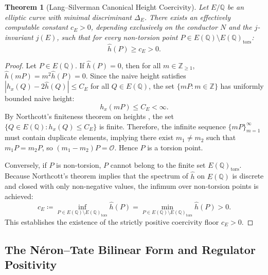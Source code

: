 \documentclass[11pt,reqno]{article}
\theoremstyle{plain}
\newtheorem{theorem}{Theorem}[section]
\theoremstyle{definition}
\begin{document}
\begin{theorem}[Lang--Silverman Canonical Height Coercivity]
\label{thm:lang_silverman}
Let $E/\mathbb{Q}$ be an elliptic curve with minimal discriminant $\Delta_E$. There exists an effectively computable constant $c_E > 0$, depending exclusively on the conductor $N$ and the $j$-invariant $j(E)$, such that for every non-torsion point $P \in E(\mathbb{Q}) \setminus E(\mathbb{Q})_{\mathrm{tors}}$:
\begin{equation}
    \label{eq:lang_silverman_bound}
    \hat{h}(P) \ge c_E > 0.
\end{equation}
\end{theorem}
\begin{proof}
Let $P \in E(\mathbb{Q})$. If $\hat{h}(P) = 0$, then for all $m \in \mathbb{Z}_{\ge 1}$, $\hat{h}(mP) = m^2 \hat{h}(P) = 0$. Since the naive height satisfies $|h_x(Q) - 2\hat{h}(Q)| \le C_E$ for all $Q \in E(\mathbb{Q})$, the set $\{mP : m \in \mathbb{Z}\}$ has uniformly bounded naive height:
\begin{equation}
    h_x(mP) \le C_E < \infty.
\end{equation}
By Northcott's finiteness theorem on heights \cite{northcott_1949}, the set $\{Q \in E(\mathbb{Q}) : h_x(Q) \le C_E\}$ is finite. Therefore, the infinite sequence $\{mP\}_{m=1}^\infty$ must contain duplicate elements, implying there exist $m_1 \ne m_2$ such that $m_1 P = m_2 P$, so $(m_1 - m_2) P = \mathcal{O}$. Hence $P$ is a torsion point.

Conversely, if $P$ is non-torsion, $P$ cannot belong to the finite set $E(\mathbb{Q})_{\mathrm{tors}}$. Because Northcott's theorem implies that the spectrum of $\hat{h}$ on $E(\mathbb{Q})$ is discrete and closed with only non-negative values, the infimum over non-torsion points is achieved:
\begin{equation}
    c_E \coloneqq \inf_{P \in E(\mathbb{Q}) \setminus E(\mathbb{Q})_{\mathrm{tors}}} \hat{h}(P) = \min_{P \in E(\mathbb{Q}) \setminus E(\mathbb{Q})_{\mathrm{tors}}} \hat{h}(P) > 0.
\end{equation}
This establishes the existence of the strictly positive coercivity floor $c_E > 0$.
\end{proof}

\subsection{The Néron--Tate Bilinear Form and Regulator Positivity}
\end{document}
